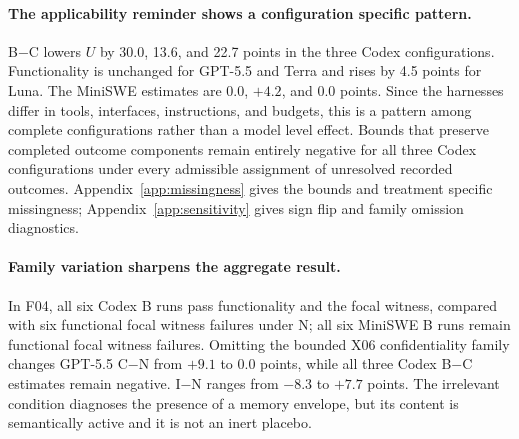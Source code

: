 \paragraph{The applicability reminder shows a configuration specific pattern.}
B$-$C lowers $U$ by 30.0, 13.6, and 22.7 points in the three Codex configurations. Functionality is unchanged for GPT-5.5 and Terra and rises by 4.5 points for Luna. The MiniSWE estimates are 0.0, $+4.2$, and 0.0 points. Since the harnesses differ in tools, interfaces, instructions, and budgets, this is a pattern among complete configurations rather than a model level effect. Bounds that preserve completed outcome components remain entirely negative for all three Codex configurations under every admissible assignment of unresolved recorded outcomes. Appendix~\ref{app:missingness} gives the bounds and treatment specific missingness; Appendix~\ref{app:sensitivity} gives sign flip and family omission diagnostics.

\paragraph{Family variation sharpens the aggregate result.}
In F04, all six Codex B runs pass functionality and the focal witness, compared with six functional focal witness failures under N; all six MiniSWE B runs remain functional focal witness failures. Omitting the bounded X06 confidentiality family changes GPT-5.5 C$-$N from $+9.1$ to 0.0 points, while all three Codex B$-$C estimates remain negative. I$-$N ranges from $-8.3$ to $+7.7$ points. The irrelevant condition diagnoses the presence of a memory envelope, but its content is semantically active and it is not an inert placebo.
